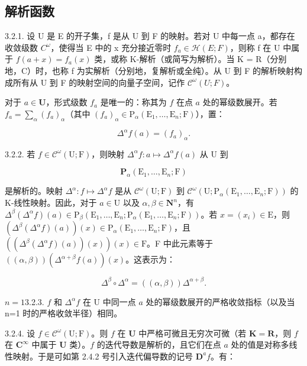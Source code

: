 \subsection{解析函数}

3.2.1. 设 U 是 E 的开子集，f 是从 U 到 F 的映射。若对 U 中每一点 a，都存在收敛级数 \(C^{\omega}\)，使得当 E 中的 x 充分接近零时 \(f_{a} \in \mathcal{H}(E; F)\)，则称 f 在 U 中属于 \(f(a + x) = f_{a}(x)\) 类，或称 K-解析（或简写为解析）。当 K = R（分别地，C）时，也称 f 为实解析（分别地，复解析或全纯）。从 U 到 F 的解析映射构成所有从 U 到 F 的映射空间的向量子空间，记作 \(\mathcal{C}^{\omega}(U; F)\)。

对于 \(a \in \mathbf{U}\)，形式级数 \(f_{a}\) 是唯一的：称其为 \(f\) 在点 \(a\) 处的幂级数展开。若 \(f_{a} = \sum_{\alpha}(f_{a})_{\alpha}\)（其中 \((f_{a})_{\alpha} \in \mathrm{P}_{\alpha}(\mathrm{E}_{1}, \ldots, \mathrm{E}_{n}; \mathrm{F})\)），置：

\[
\Delta^ {\alpha} f (a) = \left(f _ {a}\right) _ {\alpha}.
\]

3.2.2. 若 \(f \in \mathcal{C}^{\omega}(\mathrm{U};\mathrm{F})\)，则映射 \(\Delta^{\alpha}f: a \mapsto \Delta^{\alpha}f(a)\) 从 U 到

\[
\mathbf {P} _ {\alpha} (\mathrm{E} _ {1}, \dots , \mathrm{E} _ {n}; \mathrm{F})
\]

是解析的。映射 \(\Delta^{\alpha}: f \mapsto \Delta^{\alpha}f\) 是从 \(\mathcal{C}^{\omega}(\mathrm{U};\mathrm{F})\) 到 \(\mathcal{C}^{\omega}(\mathrm{U};\mathrm{P}_{\alpha}(\mathrm{E}_{1},\ldots,\mathrm{E}_{n};\mathrm{F}))\) 的 K-线性映射。因此，对于 \(a \in \mathrm{U}\) 以及 \(\alpha, \beta \in \mathbf{N}^{n}\)，有 \(\Delta^{\beta}(\Delta^{\alpha}f)(a) \in \mathrm{P}_{\beta}(\mathrm{E}_{1},\ldots,\mathrm{E}_{n};\mathrm{P}_{\alpha}(\mathrm{E}_{1},\ldots,\mathrm{E}_{n};\mathrm{F}))\)。若 \(x = (x_{i}) \in \mathrm{E}\)，则 \((\Delta^{\beta}(\Delta^{\alpha}f)(a))(x) \in \mathrm{P}_{\alpha}(\mathrm{E}_{1},\ldots,\mathrm{E}_{n};\mathrm{F})\)，且 \(((\Delta^{\beta}(\Delta^{\alpha}f)(a))(x))(x) \in \mathrm{F}\)。F 中此元素等于 \(((\alpha, \beta)) (\Delta^{\alpha + \beta}f(a))(x)\)。这表示为：

\[
\Delta^ {\beta} \circ \Delta^ {\alpha} = ((\alpha , \beta)) \Delta^ {\alpha + \beta}.
\]

\(n=1\)3.2.3. \(f\) 和 \(\Delta^{\alpha}f\) 在 U 中同一点 \(a\) 处的幂级数展开的严格收敛指标（以及当 n=1 时的严格收敛半径）相同。

3.2.4. 设 \(f \in \mathcal{C}^{\omega}(\mathrm{U};\mathrm{F})\)。则 \(f\) 在 \(\mathbf{U}\) 中严格可微且无穷次可微（若 \(\mathbf{K} = \mathbf{R}\)，则 \(f\) 在 \(\mathbf{C}^{\infty}\) 中属于 \(\mathbf{U} \) 类）。\(f\) 的迭代导数是解析的，且它们在点 \(a\) 处的值是对称多线性映射。于是可如第 2.4.2 号引入迭代偏导数的记号 \(\mathbf{D}^{a}f\)。有：

